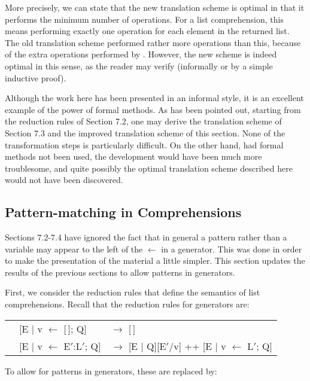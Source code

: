 More precisely, we can state that the new translation scheme is optimal in that it performs the minimum number of  operations. For a list comprehension, this means performing exactly one  operation for each element in the returned list. The old translation scheme performed rather more  operations
than this, because of the extra  operations performed by . However, the new scheme is indeed optimal in this sense, as the reader may verify (informally or by a simple inductive proof).

Although the work here has been presented in an informal style, it is an excellent example of the power of formal methods. As has been pointed out, starting from the reduction rules of Section 7.2, one may derive the translation scheme of Section 7.3 and the improved translation scheme of this section. None of the transformation steps is particularly difficult. On the other hand, had formal methods not been used, the development would have been much more troublesome, and quite possibly the optimal translation scheme described here would not have been discovered.

\subsection{Pattern-matching in Comprehensions}
Sections 7.2-7.4 have ignored the fact that in general a pattern rather than a variable may appear to the left of the $\leftarrow$ in a generator. This was done in order to make the presentation of the material a little simpler. This section updates the results of the previous sections to allow patterns in generators.

First, we consider the reduction rules that define the semantics of list comprehensions. Recall that the reduction rules for generators are:

\begin{mlcoded}
{
\setlength{\tabcolsep}{6pt}
\begin{tabular}{lll}
    \normalfont{\normalsize (1)} & [E | v $\leftarrow$ [\,]; Q] & $\rightarrow$ [\,] \\
    \normalfont{\normalsize (2)} & [E | v $\leftarrow$ E$'$:L$'$; Q] & $\rightarrow$  [E | Q][E$'$/v] ++ [E | v $\leftarrow$ L$'$; Q]
\end{tabular}
}
\end{mlcoded}

\noindent
To allow for patterns in generators, these are replaced by:

